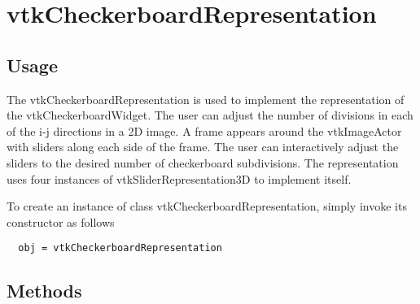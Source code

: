 \section{vtkCheckerboardRepresentation}

\subsection{Usage}

 The vtkCheckerboardRepresentation is used to implement the representation of
 the vtkCheckerboardWidget. The user can adjust the number of divisions in
 each of the i-j directions in a 2D image. A frame appears around the
 vtkImageActor with sliders along each side of the frame. The user can
 interactively adjust the sliders to the desired number of checkerboard
 subdivisions. The representation uses four instances of 
 vtkSliderRepresentation3D to implement itself.

To create an instance of class vtkCheckerboardRepresentation, simply
invoke its constructor as follows
\begin{verbatim}
  obj = vtkCheckerboardRepresentation
\end{verbatim}
\subsection{Methods}


